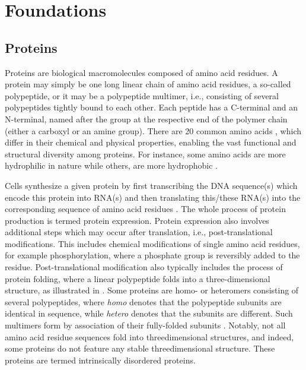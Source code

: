 \section{Foundations}
\subsection{Proteins}
\label{sec:proteins}
Proteins are biological macromolecules composed of amino acid residues. A protein may simply be one long linear chain of amino acid residues, a so-called polypeptide, or it may be a polypeptide multimer, i.e., consisting of several polypeptides tightly bound to each other. Each peptide has a C-terminal and an N-terminal, named after the group at the respective end of the polymer chain (either a carboxyl or an amine group). There are 20 common amino acids , which differ in their chemical and physical properties, enabling the vast functional and structural diversity among proteins. For instance, some amino acids are more hydrophilic in nature while others, are more hydrophobic .\par
Cells synthesize a given protein by first transcribing the DNA sequence(s) which encode this protein into RNA(s) and then translating this/these RNA(s) into the corresponding sequence of amino acid residues . The whole process of protein production is termed protein expression. Protein expression also involves additional steps which may occur after translation, i.e., post-translational modifications. This includes chemical modifications of single amino acid residues, for example phosphorylation, where a phosphate group is reversibly added to the residue. Post-translational modification also typically includes the process of protein folding, where a linear polypeptide folds into a three-dimensional structure, as illustrated in . Some proteins are homo- or heteromers consisting of several polypeptides, where \textit{homo} denotes that the polypeptide subunits are identical in sequence, while \textit{hetero} denotes that the subunits are different. Such multimers form by association of their fully-folded subunits . Notably, not all amino acid residue sequences fold into threedimensional structures, and indeed, some proteins do not feature any stable threedimensional structure. These proteins are termed intrinsically disordered proteins.

